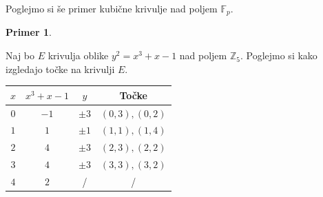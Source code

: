 \documentclass[12pt,a4paper,twoside]{article}
\theoremstyle{definition} %
\newtheorem{primer}[definicija]{Primer}
\theoremstyle{plain} %
\numberwithin{equation}{section}  %
\newcommand{\Z}{\mathbb Z}
\newcommand{\F}{\mathbb F}
\begin{document}
Poglejmo si še primer kubične krivulje nad poljem $\F_p$.

\begin{primer}~

Naj bo $E$ krivulja oblike $y^2 = x^3+x-1$ nad poljem $\Z_5$. Poglejmo si kako izgledajo točke na krivulji $E$.

\begin{table}[H]
\centering
\begin{tabular}{c|c|c|c}
$x$      & $x^3+x-1$ & $y$      & Točke         \\ \hline
$0$      & $-1$      & $\pm 3$  & $(0,3),(0,2)$ \\
$1$      & $1$       & $\pm 1$  & $(1,1),(1,4)$ \\
$2$      & $4$       & $\pm 3$  & $(2,3),(2,2)$ \\
$3$      & $4$       & $\pm 3$  & $(3,3),(3,2)$ \\
$4$      & $2$       & /        & /            
\end{tabular}
\end{table}


\end{primer}
\end{document}
